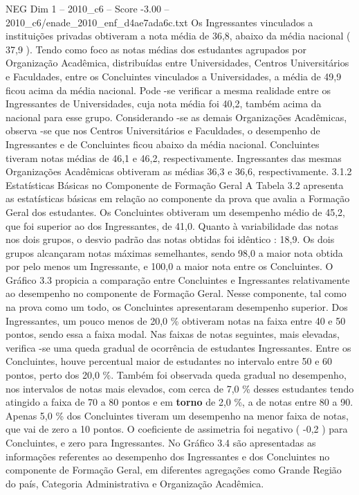 \begin{textsample}{NEG Dim 1 – 2010\_c6 – Score -3.00 – 2010\_c6/enade\_2010\_enf\_d4ae7ada6c.txt}
Os Ingressantes vinculados a instituições privadas obtiveram a nota média de 36,8, abaixo da média nacional ( 37,9 ).
Tendo como foco as notas médias dos estudantes agrupados por Organização Acadêmica, distribuídas entre Universidades, Centros Universitários e Faculdades, entre os Concluintes vinculados a Universidades, a média de 49,9 ficou acima da média nacional.
Pode -se verificar a mesma realidade entre os Ingressantes de Universidades, cuja nota média foi 40,2, também acima da nacional para esse grupo.
Considerando -se as demais Organizações Acadêmicas, observa -se que nos Centros Universitários e Faculdades, o desempenho de Ingressantes e de Concluintes ficou abaixo da média nacional.
Concluintes tiveram notas médias de 46,1 e 46,2, respectivamente.
Ingressantes das mesmas Organizações Acadêmicas obtiveram as médias 36,3 e 36,6, respectivamente. 3.1.2 Estatísticas Básicas no Componente de Formação Geral A Tabela 3.2 apresenta as estatísticas básicas em relação ao componente da prova que avalia a Formação Geral dos estudantes.
Os Concluintes obtiveram um desempenho médio de 45,2, que foi superior ao dos Ingressantes, de 41,0.
Quanto à variabilidade das notas nos dois grupos, o desvio padrão das notas obtidas foi idêntico : 18,9.
Os dois grupos alcançaram notas máximas semelhantes, sendo 98,0 a maior nota obtida por pelo menos um Ingressante, e 100,0 a maior nota entre os Concluintes.
O Gráfico 3.3 propicia a comparação entre Concluintes e Ingressantes relativamente ao desempenho no componente de Formação Geral.
Nesse componente, tal como na prova como um todo, os Concluintes apresentaram desempenho superior.
Dos Ingressantes, um pouco menos de 20,0 \% obtiveram notas na faixa entre 40 e 50 pontos, sendo essa a faixa modal.
Nas faixas de notas seguintes, mais elevadas, verifica -se uma queda gradual de ocorrência de estudantes Ingressantes.
Entre os Concluintes, houve percentual maior de estudantes no intervalo entre 50 e 60 pontos, perto dos 20,0 \%.
Também foi observada queda gradual no desempenho, nos intervalos de notas mais elevados, com cerca de 7,0 \% desses estudantes tendo atingido a faixa de 70 a 80 pontos e em \textbf{torno} de 2,0 \%, a de notas entre 80 a 90.
Apenas 5,0 \% dos Concluintes tiveram um desempenho na menor faixa de notas, que vai de zero a 10 pontos.
O coeficiente de assimetria foi negativo ( -0,2 ) para Concluintes, e zero para Ingressantes.
No Gráfico 3.4 são apresentadas as informações referentes ao desempenho dos Ingressantes e dos Concluintes no componente de Formação Geral, em diferentes agregações como Grande Região do país, Categoria Administrativa e Organização Acadêmica.

\end{textsample}

